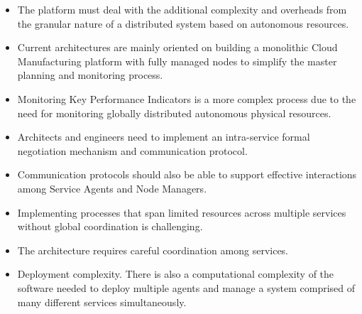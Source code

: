 \begin{itemize}
    \item The platform must deal with the additional complexity and overheads from the granular nature of a distributed system based on autonomous resources.
    \item Current architectures are mainly oriented on building a monolithic Cloud Manufacturing platform with fully managed nodes to simplify the master planning and monitoring process.
    \item Monitoring Key Performance Indicators is a more complex process due to the need for monitoring globally distributed autonomous physical resources.
    \item Architects and engineers need to implement an intra-service formal negotiation mechanism and communication protocol.
    \item Communication protocols should also be able to support effective interactions among Service Agents and Node Managers.
    \item Implementing processes that span limited resources across multiple services without global coordination is challenging.
    \item The architecture requires careful coordination among services.
    \item Deployment complexity. There is also a computational complexity of the software needed to deploy multiple agents and manage a system comprised of many different services simultaneously.
\end{itemize}


